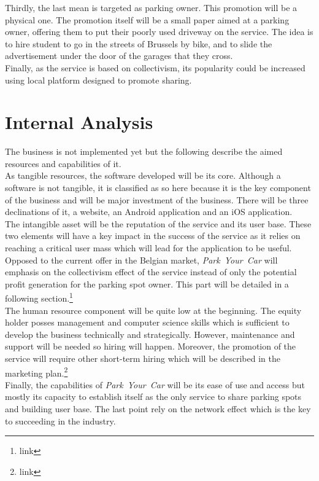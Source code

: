 \documentclass[12pt,a4paper,oneside]{book}
\newcommand{\bp}{\textit{Park~Your~Car }}
\begin{document}
Thirdly, the last mean is targeted as parking owner. This promotion will be a physical one. The promotion itself will be a small paper aimed at a parking owner, offering them to put their poorly used driveway on the service. The idea is to hire student to go in the streets of Brussels by bike, and to slide the advertisement under the door of the garages that they cross.\\

Finally, as the service is based on collectivism, its popularity could be increased using local platform designed to promote sharing.

\section{Internal Analysis}
The business is not implemented yet but the following describe the aimed resources and capabilities of it.\\

As tangible resources, the software developed will be its core. Although a software is not tangible, it is classified as so here because it is the key component of the business and will be major investment of the business. There will be three declinations of it, a website, an Android application and an iOS application.\\

The intangible asset will be the reputation of the service and its user base. These two elements will have a key impact in the success of the service as it relies on reaching a critical user mass which will lead for the application to be useful. Opposed to the current offer in the Belgian market, \bp will emphasis on the collectivism effect of the service instead of only the potential profit generation for the parking spot owner. This part will be detailed in a following section.\footnote{link}\\

The human resource component will be quite low at the beginning. The equity holder posses management and computer science skills which is sufficient to develop the business technically and strategically. However, maintenance and support will be needed so hiring will happen. Moreover, the promotion of the service will require other short-term hiring which will be described in the marketing plan.\footnote{link}\\

Finally, the capabilities of \bp will be its ease of use and access but mostly its capacity to establish itself as the only service to share parking spots and building user base. The last point rely on the network effect which is the key to succeeding in the industry.
\end{document}
